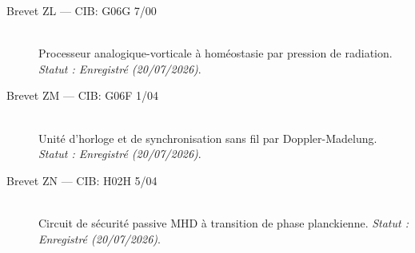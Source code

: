 \begin{description}
    \item[Brevet ZL --- CIB: G06G 7/00] \hfill \\ Processeur analogique-vorticale à homéostasie par pression de radiation. \textit{Statut : Enregistré (20/07/2026)}.
    \item[Brevet ZM --- CIB: G06F 1/04] \hfill \\ Unité d'horloge et de synchronisation sans fil par Doppler-Madelung. \textit{Statut : Enregistré (20/07/2026)}.
    \item[Brevet ZN --- CIB: H02H 5/04] \hfill \\ Circuit de sécurité passive MHD à transition de phase planckienne. \textit{Statut : Enregistré (20/07/2026)}.
\end{description}
